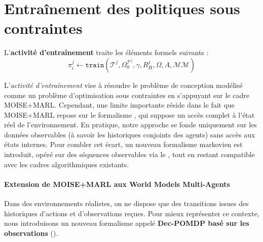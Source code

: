 \chapter{Entraînement des politiques sous contraintes}
\label{chap:training}

L'\textbf{activité d'entraînement} traite les éléments formels suivants :
%
\begin{displaymath}
    \pi^j_i \gets \texttt{train}(\mathcal{T}^j, \Omega^{\mathcal{T}^j}_0, \gamma, R^j_H, \Omega, A, \mathcal{MM})
\end{displaymath}

L'\textit{activité d'entraînement} vise à résoudre le problème de conception modélisé comme un problème d'optimisation sous contraintes en s'appuyant sur le cadre MOISE+MARL. Cependant, une limite importante réside dans le fait que MOISE+MARL repose sur le formalisme , qui suppose un accès complet à l'état réel de l'environnement. En pratique, notre approche se fonde uniquement sur les données observables (à savoir les historiques conjoints des agents) sans accès aux états internes. Pour combler cet écart, un nouveau formalisme markovien est introduit, opéré sur des séquences observables via le , tout en restant compatible avec les cadres algorithmiques  existants.

\subsubsection{Extension de MOISE+MARL aux World Models Multi-Agents}

\noindent Dans des environnements réalistes, on ne dispose que des transitions issues des historiques d'actions et d'observations reçues. Pour mieux représenter ce contexte, nous introduisons un nouveau formalisme appelé \textbf{Dec-POMDP basé sur les observations} ().

